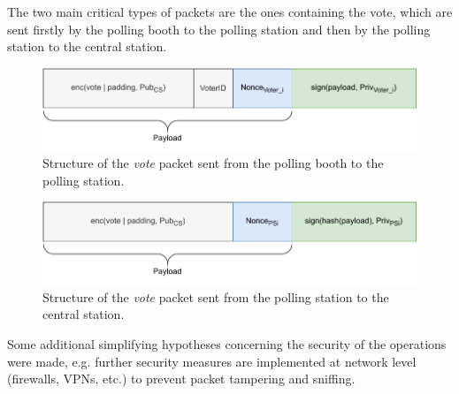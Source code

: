 The two main critical types of packets are the ones containing the vote, which are sent firstly by the polling booth to the polling station and then by the polling station to the central station.\\

\begin{figure}[H]
    \begin{center}
        \includegraphics[scale=1]{img/packet1.pdf}
    \end{center}
    \vspace*{-0.5cm}
    \caption{Structure of the \textit{vote} packet sent from the polling booth to the polling station.}
    \label{fig:packet1}
\end{figure}

\begin{figure}[H]
    \begin{center}
        \includegraphics[scale=1]{img/packet2.pdf}
    \end{center}
    \vspace*{-0.5cm}
    \caption{Structure of the \textit{vote} packet sent from the polling station  to the central station.}
    \label{fig:packet2}
\end{figure}

Some additional simplifying hypotheses concerning the security of the operations were made, e.g. further security measures are implemented at network level (firewalls, VPNs, etc.) to prevent packet tampering and sniffing.